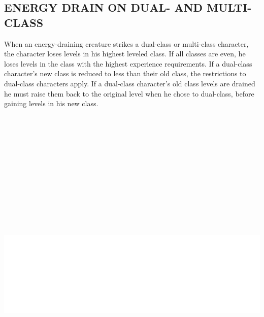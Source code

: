 \begin{multicols}{2}
\subsection{ENERGY DRAIN ON DUAL- AND MULTI-CLASS}

When an energy-draining creature strikes a dual-class or multi-class character, the character loses levels in his highest leveled class.  If all classes are even, he loses levels in the class with the highest experience requirements.  If a dual-class character's new class is reduced to less than their old class, the restrictions to dual-class characters apply.  If a dual-class character's old class levels are drained he must raise them back to the original level when he chose to dual-class, before gaining levels in his new class.

\end{multicols}

\noindent\includegraphics[width=6.75in, height=6.5in]{testblock.pdf} 

\pagebreak

\thispagestyle{empty}

\label{gothron}

